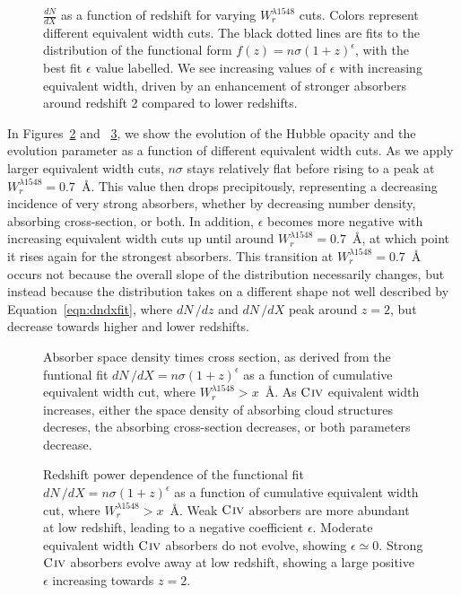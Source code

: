 \begin{figure}[bth]
\caption{$\frac{dN}{dX}$ as a function of redshift for varying $W_r^{\lambda1548}$ cuts. Colors represent different equivalent width cuts. The black dotted lines are fits to the distribution of the functional form $f(z) = n\sigma (1 + z)^{\epsilon}$, with the best fit $\epsilon$ value labelled. We see increasing values of $\epsilon$ with increasing equivalent width, driven by an enhancement of stronger {\CIV} absorbers around redshift 2 compared to lower redshifts.}
\label{fig:dndx_cuts}
\end{figure}

In Figures~\ref{fig:nsigma} and ~\ref{fig:epsilon}, we show the evolution of the Hubble opacity and the evolution parameter as a function of different equivalent width cuts. As we apply larger equivalent width cuts, $n\sigma$ stays relatively flat before rising to a peak at $W_r^{\lambda1548} = 0.7$~{\AA}. This value then drops precipitously, representing a decreasing incidence of very strong {\CIV} absorbers, whether by decreasing number density, absorbing cross-section, or both. In addition, $\epsilon$ becomes more negative with increasing equivalent width cuts up until around $W_r^{\lambda1548} = 0.7$~{\AA}, at which point it rises again for the strongest {\CIV} absorbers. This transition at $W_r^{\lambda1548} = 0.7$~{\AA} occurs not because the overall slope of the distribution necessarily changes, but instead because the distribution takes on a different shape not well described by Equation~\ref{eqn:dndxfit}, where $dN\,/dz$ and $dN\,/dX$ peak around $z = 2$, but decrease towards higher and lower redshifts.

\begin{figure}[bth]
\caption{Absorber space density times cross section, as derived from the funtional fit $dN\,/dX = n\sigma (1 + z)^{\epsilon}$ as a function of cumulative equivalent width cut, where $W_r^{\lambda1548} > x$~{\AA}. As ${\hbox{{\rm C}\kern 0.1em{\sc iv}}}$ equivalent width increases, either the space density of absorbing cloud structures decreses, the absorbing cross-section decreases, or both parameters decrease.}
\label{fig:nsigma}
\end{figure}

\begin{figure}[bth]
\caption{Redshift power dependence of the functional fit $dN\,/dX = n\sigma (1 + z)^{\epsilon}$ as a function of cumulative equivalent width cut, where $W_r^{\lambda1548} > x$~{\AA}. Weak ${\hbox{{\rm C}\kern 0.1em{\sc iv}}}$ absorbers are more abundant at low redshift, leading to a negative coefficient $\epsilon$. Moderate equivalent width ${\hbox{{\rm C}\kern 0.1em{\sc iv}}}$ absorbers do not evolve, showing $\epsilon \simeq 0$. Strong ${\hbox{{\rm C}\kern 0.1em{\sc iv}}}$ absorbers evolve away at low redshift, showing a large positive $\epsilon$ increasing towards $z = 2$.}
\label{fig:epsilon}
\end{figure}

